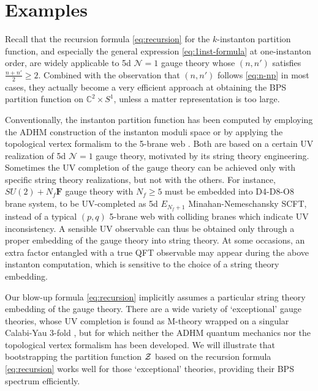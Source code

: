 \documentclass[letterpaper, 11pt]{article}
\def\IC{\mathbb{C}}
\def\CZ{{\cal Z}}
\begin{document}
{%





\section{Examples} \label{sec:example}

Recall that the recursion formula \eqref{eq:recursion} for the $k$-instanton partition function, and especially the general expression \eqref{eq:1inst-formula} at one-instanton order, are widely applicable to 5d $\mathcal{N}=1$ gauge theory whose $(n,n')$ satisfies $\frac{n+n'}{2}\geq 2$. Combined with the observation that $(n,n')$ follows \eqref{eq:n-np} in most cases, they actually become  a very efficient approach at obtaining the BPS partition function on $\IC^2 \times S^1$, unless a matter representation is too large. 

Conventionally, the instanton partition function has been  computed by employing the ADHM construction of the instanton moduli space \cite{Atiyah:1978ri,Nekrasov:2002qd,Nekrasov:2003rj} or by applying the topological vertex formalism to the 5-brane web \cite{Aganagic:2003db,Iqbal:2007ii}. Both are based on a certain UV realization of 5d $\mathcal{N}=1$ gauge theory,  motivated by its string theory engineering. Sometimes the UV completion of the gauge theory can be achieved only with specific string theory realizations, but not with the others. For instance, $SU(2) + N_f \mathbf{F}$ gauge theory with $N_f\geq 5$ must be embedded into D4-D8-O8 brane system, to be UV-completed as 5d $E_{N_f+1}$ Minahan-Nemeschansky SCFT, instead of a typical $(p,q)$ 5-brane web with colliding branes which indicate UV inconsistency. A sensible UV observable can thus be 
obtained only through a proper embedding of the gauge theory into string theory. At some occasions, an extra factor entangled with a true QFT observable may  appear during the above instanton computation, which is sensitive to the choice of a string theory embedding.


Our blow-up formula \eqref{eq:recursion} implicitly assumes a particular string theory embedding of the gauge theory.  There are a wide variety of `exceptional' gauge theories, whose UV completion is found as M-theory wrapped on a singular Calabi-Yau 3-fold \cite{Diaconescu:1998cn, Jefferson:2018irk, Bhardwaj:2018yhy, Apruzzi:2019opn}, but for which neither the ADHM quantum mechanics nor the topological vertex formalism has been developed. We will illustrate that bootstrapping the partition function $\CZ$ based on the recursion formula \eqref{eq:recursion} works well for those `exceptional' theories, providing their BPS spectrum efficiently.





}
\end{document}
